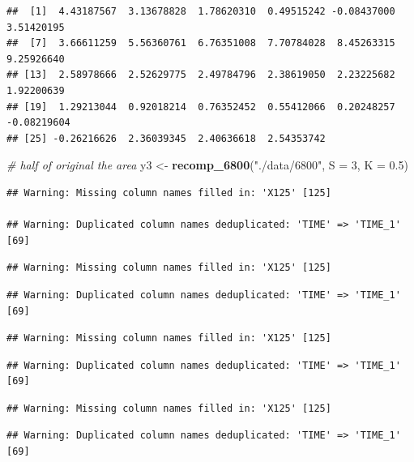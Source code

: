 \documentclass[
]{krantz}
\makeatletter
\newenvironment{Shaded}{\begin{snugshade}}{\end{snugshade}}
\newcommand{\CommentTok}[1]{\textcolor[rgb]{0.56,0.35,0.01}{\textit{#1}}}
\newcommand{\DataTypeTok}[1]{\textcolor[rgb]{0.13,0.29,0.53}{#1}}
\newcommand{\DecValTok}[1]{\textcolor[rgb]{0.00,0.00,0.81}{#1}}
\newcommand{\FloatTok}[1]{\textcolor[rgb]{0.00,0.00,0.81}{#1}}
\newcommand{\KeywordTok}[1]{\textcolor[rgb]{0.13,0.29,0.53}{\textbf{#1}}}
\newcommand{\NormalTok}[1]{#1}
\newcommand{\StringTok}[1]{\textcolor[rgb]{0.31,0.60,0.02}{#1}}
\newenvironment{kframe}{%
\medskip{}
\setlength{\fboxsep}{.8em}
 \def\at@end@of@kframe{}%
 \ifinner\ifhmode%
  \def\at@end@of@kframe{\end{minipage}}%
  \begin{minipage}{\columnwidth}%
 \fi\fi%
 \def\FrameCommand##1{\hskip\@totalleftmargin \hskip-\fboxsep
 \colorbox{shadecolor}{##1}\hskip-\fboxsep
     \hskip-\linewidth \hskip-\@totalleftmargin \hskip\columnwidth}%
 \MakeFramed {\advance\hsize-\width
   \@totalleftmargin\z@ \linewidth\hsize
   \@setminipage}}%
 {\par\unskip\endMakeFramed%
 \at@end@of@kframe}
\renewenvironment{Shaded}{\begin{kframe}}{\end{kframe}}
\makeatother
\begin{document}
\begin{verbatim}
##  [1]  4.43187567  3.13678828  1.78620310  0.49515242 -0.08437000  3.51420195
##  [7]  3.66611259  5.56360761  6.76351008  7.70784028  8.45263315  9.25926640
## [13]  2.58978666  2.52629775  2.49784796  2.38619050  2.23225682  1.92200639
## [19]  1.29213044  0.92018214  0.76352452  0.55412066  0.20248257 -0.08219604
## [25] -0.26216626  2.36039345  2.40636618  2.54353742
\end{verbatim}

\begin{Shaded}
\begin{Highlighting}[]
\CommentTok{# half of original the area}
\NormalTok{y3 <-}\StringTok{ }\KeywordTok{recomp_6800}\NormalTok{(}\StringTok{"./data/6800"}\NormalTok{, }\DataTypeTok{S =} \DecValTok{3}\NormalTok{, }\DataTypeTok{K =} \FloatTok{0.5}\NormalTok{)}
\end{Highlighting}
\end{Shaded}

\begin{verbatim}
## Warning: Missing column names filled in: 'X125' [125]

## Warning: Duplicated column names deduplicated: 'TIME' => 'TIME_1' [69]
\end{verbatim}

\begin{verbatim}
## Warning: Missing column names filled in: 'X125' [125]
\end{verbatim}

\begin{verbatim}
## Warning: Duplicated column names deduplicated: 'TIME' => 'TIME_1' [69]
\end{verbatim}

\begin{verbatim}
## Warning: Missing column names filled in: 'X125' [125]
\end{verbatim}

\begin{verbatim}
## Warning: Duplicated column names deduplicated: 'TIME' => 'TIME_1' [69]
\end{verbatim}

\begin{verbatim}
## Warning: Missing column names filled in: 'X125' [125]
\end{verbatim}

\begin{verbatim}
## Warning: Duplicated column names deduplicated: 'TIME' => 'TIME_1' [69]
\end{verbatim}
\end{document}
